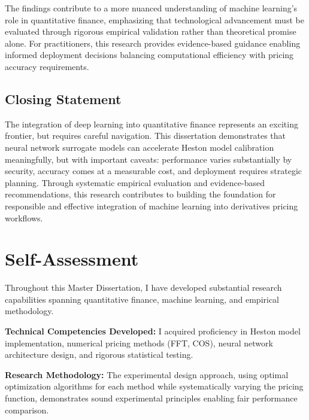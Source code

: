 \documentclass[12pt,a4paper]{article}
\begin{document}
The findings contribute to a more nuanced understanding of machine learning's role in quantitative finance, emphasizing that technological advancement must be evaluated through rigorous empirical validation rather than theoretical promise alone. For practitioners, this research provides evidence-based guidance enabling informed deployment decisions balancing computational efficiency with pricing accuracy requirements.

\subsection{Closing Statement}

The integration of deep learning into quantitative finance represents an exciting frontier, but requires careful navigation. This dissertation demonstrates that neural network surrogate models can accelerate Heston model calibration meaningfully, but with important caveats: performance varies substantially by security, accuracy comes at a measurable cost, and deployment requires strategic planning. Through systematic empirical evaluation and evidence-based recommendations, this research contributes to building the foundation for responsible and effective integration of machine learning into derivatives pricing workflows.




\newpage

\section*{Self-Assessment}


Throughout this Master Dissertation, I have developed substantial research capabilities spanning quantitative finance, machine learning, and empirical methodology.

\textbf{Technical Competencies Developed:} I acquired proficiency in Heston model implementation, numerical pricing methods (FFT, COS), neural network architecture design, and rigorous statistical testing.

\textbf{Research Methodology:} The experimental design approach, using optimal optimization algorithms for each method while systematically varying the pricing function, demonstrates sound experimental principles enabling fair performance comparison.
\end{document}
